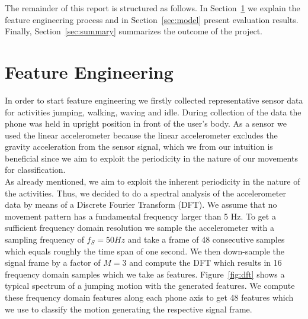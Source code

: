 \documentclass[conference]{IEEEtran}
\begin{document}
The remainder of this report is structured as follows. In Section~\ref{sec:features} we explain the feature engineering process and in Section~\ref{sec:model} present evaluation results. Finally, Section~\ref{sec:summary} summarizes the outcome of the project.

\section{Feature Engineering}
\label{sec:features}

In order to start feature engineering we firstly collected representative sensor data for activities jumping, walking, waving and idle. During collection of the data the phone was held in upright position in front of the user's body. As a sensor we used the linear accelerometer because the linear accelerometer excludes the gravity acceleration from the sensor signal, which we from our intuition is beneficial since we aim to exploit the periodicity in the nature of our movements for classification.\\

As already mentioned, we aim to exploit the inherent periodicity in the nature of the activities. Thus, we decided to do a spectral analysis of the accelerometer data by means of a Discrete Fourier Transform (DFT)\cite{dft}. We assume that no movement pattern has a fundamental frequency larger than 5 Hz. To get a sufficient frequency domain resolution we sample the accelerometer with a sampling frequency of $f_S = 50 Hz$ and take a frame of 48 consecutive samples which equals roughly the time span of one second. We then down-sample the signal frame by a factor of $M = 3$ and compute the DFT which results in 16 frequency domain samples which we take as features. Figure~\ref{fig:dft} shows a typical spectrum of a jumping motion with the generated features. We compute these frequency domain features along each phone axis to get 48 features which we use to classify the motion generating the respective signal frame. 
\end{document}
